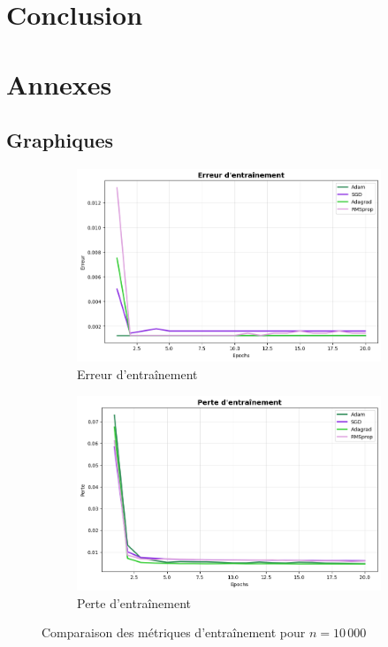 \documentclass[a4paper,12pt]{article}
\begin{document}
\section{Conclusion}

\newpage

\appendix
\section{Annexes}
\label{annexes}

\subsection{Graphiques}

\begin{figure}[H]
\centering
\begin{subfigure}[b]{0.48\textwidth}
    \includegraphics[width=\textwidth]{images/training_error_n10k.png}
    \caption[Erreur d'entraînement (n=10k)]{Erreur d'entraînement}
    \label{fig:training_10k}
\end{subfigure}
\hfill
\begin{subfigure}[b]{0.48\textwidth}
    \includegraphics[width=\textwidth]{images/training_loss_n10k.png}
    \caption[Perte d'entraînement (n=10k)]{Perte d'entraînement}
    \label{fig:loss_10k}
\end{subfigure}
\caption{Comparaison des métriques d'entraînement pour $n=10\,000$}
\label{fig:training_comparison}
\end{figure}
\end{document}

